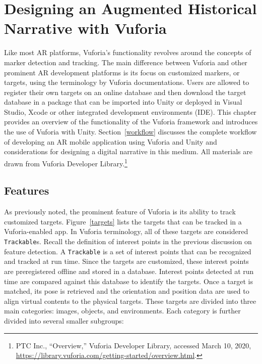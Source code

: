 \chapter{Designing an Augmented Historical Narrative with Vuforia}\label{vuforia}
Like most AR platforms, Vuforia's functionality revolves around the concepts of marker detection and tracking. The main difference between Vuforia and other prominent AR development platforms is its focus on customized markers, or targets, using the terminology by Vuforia documentations. Users are allowed to register their own targets on an online database and then download the target database in a package that can be imported into Unity or deployed in Visual Studio, Xcode or other integrated development environments (IDE). This chapter provides an overview of the functionality of the Vuforia framework and introduces the use of Vuforia with Unity. Section~\ref{workflow} discusses the complete workflow of developing an AR mobile application using Vuforia and Unity and considerations for designing a digital narrative in this medium. All materials are drawn from Vuforia Developer Library.\footnote{PTC Inc., “Overview,” Vuforia Developer Library, accessed March 10, 2020, \url{https://library.vuforia.com/getting-started/overview.html}.}

\section{Features}
As previously noted, the prominent feature of Vuforia is its ability to track customized targets. Figure~\ref{targets} lists the targets that can be tracked in a Vuforia-enabled app. In Vuforia terminology, all of these targets are considered \texttt{Trackable}s. Recall the definition of interest points in the previous discussion on feature detection. A \texttt{Trackable} is a set of interest points that can be recognized and tracked at run time. Since the targets are customized, these interest points are preregistered offline and stored in a database. Interest points detected at run time are compared against this database to identify the targets. Once a target is matched, its pose is retrieved and the orientation and position data are used to align virtual contents to the physical targets. These targets are divided into three main categories: images, objects, and environments. Each category is further divided into several smaller subgroups:

\begin{figure}[!ht]
\end{figure}
\vspace{-.2 in}

